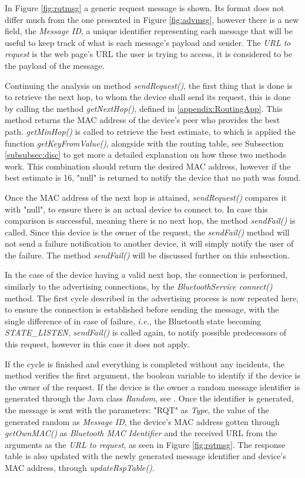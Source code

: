 In Figure \ref{fig:rqtmsg} a generic request message is shown. Its format does not differ much from the one presented in Figure \ref{fig:advmsg}, however there is a new field, the \textit{Message ID}, a unique identifier representing each message that will be useful to keep track of what is each message's payload and sender. The \textit{\gls{URL} to request} is the web page's \gls{URL} the user is trying to access, it is considered to be the payload of the message.

Continuing the analysis on method \textit{sendRequest()}, the first thing that is done is to retrieve the next hop, to whom the device shall send its request, this is done by calling the method \textit{getNextHop()}, defined in \ref{appendix:RoutingApp}. This method returns the \gls{MAC} address of the device's peer who provides the best path. \textit{getMinHop()} is called to retrieve the best estimate, to which is applied the function \textit{getKeyFromValue()}, alongside with the routing table, see Subsection \ref{subsubsec:disc} to get more a detailed explanation on how these two methods work. This combination should return the desired \gls{MAC} address, however if the best estimate is 16, "null" is returned to notify the device that no path was found.

Once the \gls{MAC} address of the next hop is attained, \textit{sendRequest()} compares it with "null", to ensure there is an actual device to connect to. In case this comparison is successful, meaning there is no next hop, the method \textit{sendFail()} is called. Since this device is the owner of the request, the \textit{sendFail()} method will not send a failure notification to another device, it will simply notify the user of the failure. The method \textit{sendFail()} will be discussed further on this subsection.

In the case of the device having a valid next hop, the connection is performed, similarly to the advertising connections, by the \textit{BluetoothService connect()} method. The first cycle described in the advertising process is now repeated here, to ensure the connection is established before sending the message, with the single difference of in case of failure, \textit{i.e.}, the Bluetooth state becoming \textit{STATE\_LISTEN}, \textit{sendFail()} is called again, to notify possible predecessors of this request, however in this case it does not apply.

If the cycle is finished and everything is completed without any incidents, the method verifies the first argument, the boolean variable to identify if the device is the owner of the request. If the device is the owner a random message identifier is generated through the Java class \textit{Random}, see \cite{random}. Once the identifier is generated, the message is sent with the parameters: "RQT" as \textit{Type}, the value of the generated random as \textit{Message ID}, the device's \gls{MAC} address gotten through \textit{getOwnMAC()} as \textit{Bluetooth MAC Identifier} and the received \gls{URL} from the arguments as the \textit{\gls{URL} to request}, as seen in Figure \ref{fig:rqtmsg}. The response table is also updated with the newly generated message identifier and device's \gls{MAC} address, through \textit{updateRspTable()}.

